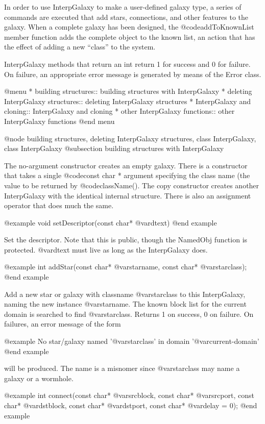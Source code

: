 In order to use InterpGalaxy to make a user-defined galaxy type,
a series of commands are executed that add stars, connections, and
other features to the galaxy.  When a complete galaxy has been
designed, the @code{addToKnownList} member function adds the complete
object to the known list, an action that has the effect of adding a
new ``class'' to the system.

InterpGalaxy methods that return an int return 1 for success and 0
for failure.  On failure, an appropriate error message is generated
by means of the Error class.


@menu
* building structures::         building structures with InterpGalaxy
* deleting InterpGalaxy structures::  deleting InterpGalaxy structures
* InterpGalaxy and cloning::    InterpGalaxy and cloning
* other InterpGalaxy functions::  other InterpGalaxy functions
@end menu

@node building structures, deleting InterpGalaxy structures, class InterpGalaxy, class InterpGalaxy
@subsection building structures with InterpGalaxy

The no-argument constructor creates an empty galaxy.  There is a
constructor that takes a single @code{const char *} argument
specifying the class name (the value to be returned by @code{className()}.
The copy constructor creates another InterpGalaxy with the identical
internal structure.  There is also an assignment operator that does
much the same.

@example
void setDescriptor(const char* @var{dtext})
@end example

Set the descriptor.  Note that this is public, though the NamedObj
function is protected. @var{dtext} must live as long as the InterpGalaxy
does.

@example
int addStar(const char* @var{starname}, const char* @var{starclass});
@end example

Add a new star or galaxy with classname @var{starclass} to this
InterpGalaxy, naming the new instance @var{starname}.  The known block
list for the current domain is searched to find @var{starclass}.
Returns 1 on success, 0 on failure.  On failures, an error message
of the form

@example
No star/galaxy named '@var{starclass}' in domain '@var{current-domain}'
@end example

will be produced.  The name is a misnomer since @var{starclass} may
name a galaxy or a wormhole.

@example
int connect(const char* @var{srcblock}, const char* @var{srcport},
            const char* @var{dstblock}, const char* @var{dstport},
            const char* @var{delay} = 0);
@end example

